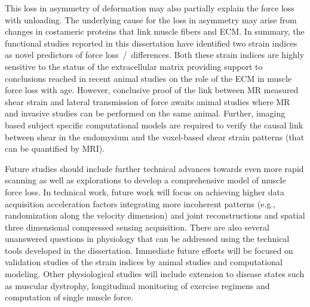 This loss in asymmetry of deformation may also partially explain the force loss with unloading. 
The underlying cause for the loss in asymmetry may arise from changes in costameric proteins that link muscle fibers and ECM. 
In summary, the functional studies reported in this dissertation have identified two strain indices as novel predictors of force loss~/~differences. 
Both these strain indices are highly sensitive to the status of the extracellular matrix providing support to conclusions reached in recent animal studies on the role of the ECM in muscle force loss with age. 
However, conclusive proof of the link between MR measured shear strain and lateral transmission of force awaits animal studies where MR and invasive studies can be performed on the same animal. 
Further, imaging based subject specific computational models are required to verify the causal link between shear in the endomysium and the voxel-based shear strain patterns (that can be quantified by MRI).

Future studies should include further technical advances towards even more rapid scanning as well as explorations to develop a comprehensive model of muscle force loss. 
In technical work, future work will focus on achieving higher data acquisition acceleration factors integrating more incoherent patterns (e.g., randomization along the velocity dimension) and joint reconstructions and spatial three dimensional compressed sensing acquisition. 
There are also several unanswered questions in physiology that can be addressed using the technical tools developed in the dissertation. 
Immediate future efforts will be focused on validation studies of the strain indices by animal studies and computational modeling. 
Other physiological studies will include extension to disease states such as muscular dystrophy, longitudinal monitoring of exercise regimens and computation of single muscle force.

